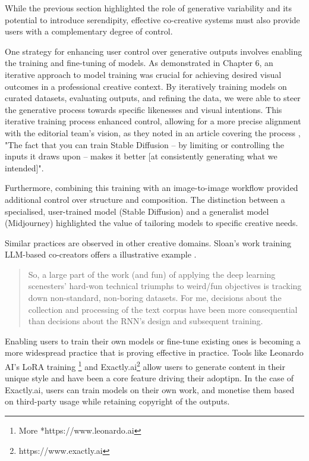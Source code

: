 While the previous section highlighted the role of generative variability and its potential to introduce serendipity, effective co-creative systems must also provide users with a complementary degree of control. 

One strategy for enhancing user control over generative outputs involves enabling the training and fine-tuning of models. As demonstrated in Chapter 6, an iterative approach to model training was crucial for achieving desired visual outcomes in a professional creative context. By iteratively training models on curated datasets, evaluating outputs, and refining the data, we were able to steer the generative process towards specific likenesses and visual intentions. This iterative training process enhanced control, allowing for a more precise alignment with the editorial team's vision, as they noted in an article covering the process \cite{Drummond2023-bh}, "The fact that you can train Stable Diffusion – by limiting or controlling the inputs it draws upon – makes it better [at consistently generating what we intended]".

Furthermore, combining this training with an image-to-image workflow provided additional control over structure and composition. The distinction between a specialised, user-trained model (Stable Diffusion) and a generalist model (Midjourney) highlighted the value of tailoring models to specific creative needs.

Similar practices are observed in other creative domains. Sloan's work training LLM-based co-creators offers a illustrative example \cite{Sloan2016-fj}. 

\begin{quote}
So, a large part of the work (and fun) of applying the deep learning scenesters' hard-won technical triumphs to weird/fun objectives is tracking down non-standard, non-boring datasets. For me, decisions about the collection and processing of the text corpus have been more consequential than decisions about the RNN's design and subsequent training.
\end{quote}

Enabling users to train their own models or fine-tune existing ones is becoming a more widespread practice that is proving effective in practice. Tools like Leonardo AI's LoRA training \footnote{More *https://www.leonardo.ai} and Exactly.ai\footnote{https://www.exactly.ai} allow users to generate content in their unique style and have been a core feature driving their adoptipn. In the case of Exactly.ai, users can train models on their own work, and monetise them based on third-party usage while retaining copyright of the outputs.

